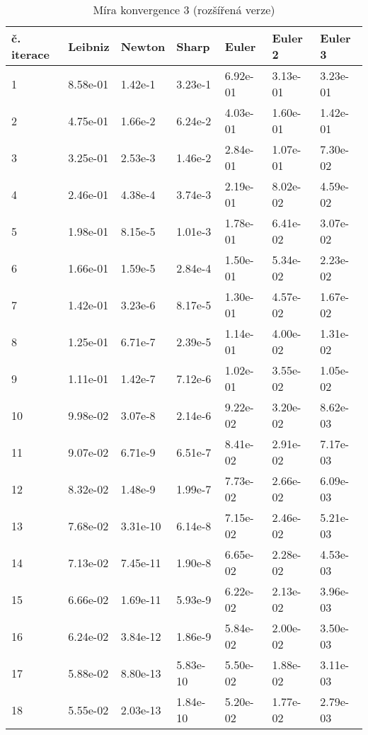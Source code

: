 \documentclass[soc]{gzwroc} %
\begin{document}
\begin{table}[h!]
\caption{Míra konvergence 3 (rozšířená verze)}
\begin{tabular}{|l|l|l|l|l|l|l|}
\hline
\multicolumn{1}{|l|}{\bfseries č. iterace} & \multicolumn{1}{l|}{\bfseries Leibniz} & \multicolumn{1}{l|}{\bfseries Newton} & \multicolumn{1}{l|}{\bfseries Sharp} & \multicolumn{1}{l|}{\bfseries Euler} & \multicolumn{1}{l|}{\bfseries Euler 2} & \multicolumn{1}{l|}{\bfseries Euler 3}  \\ \hline
1 & 8.58e-01 & 1.42e-1 & 3.23e-1 & 6.92e-01 & 3.13e-01 & 3.23e-01 \\ \hline 
2 & 4.75e-01 & 1.66e-2 & 6.24e-2 & 4.03e-01 & 1.60e-01 & 1.42e-01 \\ \hline 
3 & 3.25e-01 & 2.53e-3 & 1.46e-2 & 2.84e-01 & 1.07e-01 & 7.30e-02 \\ \hline 
4 & 2.46e-01 & 4.38e-4 & 3.74e-3 & 2.19e-01 & 8.02e-02 & 4.59e-02 \\ \hline 
5 & 1.98e-01 & 8.15e-5 & 1.01e-3 & 1.78e-01 & 6.41e-02 & 3.07e-02 \\ \hline 
6 & 1.66e-01 & 1.59e-5 & 2.84e-4 & 1.50e-01 & 5.34e-02 & 2.23e-02 \\ \hline 
7 & 1.42e-01 & 3.23e-6 & 8.17e-5 & 1.30e-01 & 4.57e-02 & 1.67e-02 \\ \hline 
8 & 1.25e-01 & 6.71e-7 & 2.39e-5 & 1.14e-01 & 4.00e-02 & 1.31e-02 \\ \hline 
9 & 1.11e-01 & 1.42e-7 & 7.12e-6 & 1.02e-01 & 3.55e-02 & 1.05e-02 \\ \hline 
10 & 9.98e-02 & 3.07e-8 & 2.14e-6 & 9.22e-02 & 3.20e-02 & 8.62e-03 \\ \hline 
11 & 9.07e-02 & 6.71e-9 & 6.51e-7 & 8.41e-02 & 2.91e-02 & 7.17e-03 \\ \hline 
12 & 8.32e-02 & 1.48e-9 & 1.99e-7 & 7.73e-02 & 2.66e-02 & 6.09e-03 \\ \hline 
13 & 7.68e-02 & 3.31e-10 & 6.14e-8 & 7.15e-02 & 2.46e-02 & 5.21e-03 \\ \hline 
14 & 7.13e-02 & 7.45e-11 & 1.90e-8 & 6.65e-02 & 2.28e-02 & 4.53e-03 \\ \hline 
15 & 6.66e-02 & 1.69e-11 & 5.93e-9 & 6.22e-02 & 2.13e-02 & 3.96e-03 \\ \hline 
16 & 6.24e-02 & 3.84e-12 & 1.86e-9 & 5.84e-02 & 2.00e-02 & 3.50e-03 \\ \hline 
17 & 5.88e-02 & 8.80e-13 & 5.83e-10 & 5.50e-02 & 1.88e-02 & 3.11e-03 \\ \hline 
18 & 5.55e-02 & 2.03e-13 & 1.84e-10 & 5.20e-02 & 1.77e-02 & 2.79e-03 \\ \hline 

\end{tabular}
\end{table}
\end{document}
